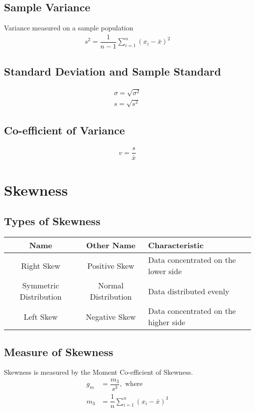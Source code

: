 \documentclass[../main.tex]{subfile}
\begin{document}
    \subsection{Sample Variance}
    Variance measured on a sample population
    \begin{align}
        s^2 = \dfrac{1}{n-1} \sum_{i=1}^{n} \left( x_i - \bar{x} \right)^2
    \end{align}

    \subsection{Standard Deviation and Sample Standard}
    \begin{align}
        \sigma = \sqrt{\sigma^2}\\
        s=\sqrt{s^2}
    \end{align}

    \subsection{Co-efficient of Variance}
    \begin{align}
        v = \dfrac{s}{\bar{x}}
    \end{align}

    \section{Skewness}
    \subsection{Types of Skewness}
    \begin{table}[!h]
        \centering
        \begin{tabular}{c|c|l}
            Name & Other Name & Characteristic\\
            \hline
            Right Skew & Positive Skew & Data concentrated on the lower side\\
            Symmetric Distribution & Normal Distribution & Data distributed evenly\\
            Left Skew & Negative Skew & Data concentrated on the higher side
        \end{tabular}
    \end{table}

    \subsection{Measure of Skewness}
    Skewness is measured by the Moment Co-efficient of Skewness.
    \begin{align}
        g_m &= \dfrac{m_3}{s^3}, \text{ where}\\
        m_3 &= \dfrac{1}{n}\sum_{i=1}^{n} \left( x_i - \bar{x} \right)^3
    \end{align}
\end{document}
